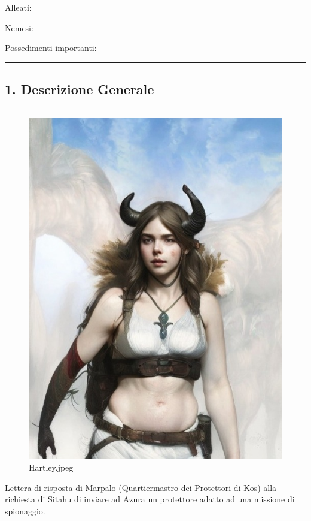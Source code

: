 Alleati:

Nemesi:

Possedimenti importanti:

\begin{center}\rule{0.5\linewidth}{0.5pt}\end{center}

\subsection{1. Descrizione Generale}\label{descrizione-generale}

\begin{center}\rule{0.5\linewidth}{0.5pt}\end{center}

\begin{figure}
\centering
\includegraphics{Hartley.jpeg}
\caption{Hartley.jpeg}
\end{figure}

Lettera di risposta di Marpalo (Quartiermastro dei Protettori di Kos)
alla richiesta di Sitahu di inviare ad Azura un protettore adatto ad una
missione di spionaggio.

